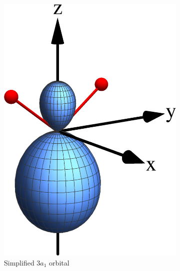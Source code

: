 \begin{figure}
  \centering
  \begin{subfigure}[b]{0.25\linewidth}
    \centering
    \includegraphics[width=\textwidth]{figures/ch_H2O/3a1/3a1extended.eps}
    \caption{Simplified $3a_{1}$ orbital}\label{fig:3a1_reduced}
  \end{subfigure}
  \,
  \begin{subfigure}[b]{0.25\linewidth}
    \centering

\end{subfigure}
\end{figure}
